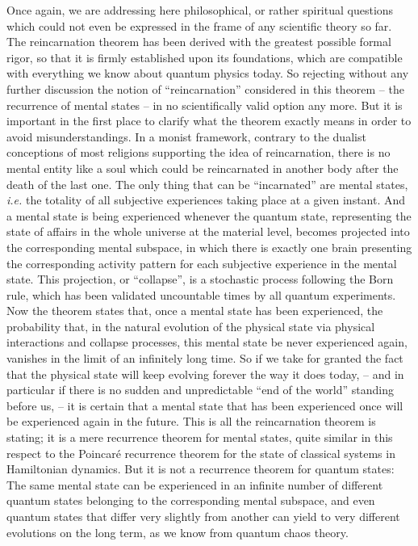  Once again, we are addressing here philosophical, or rather spiritual questions which could not even be expressed in the frame of any scientific theory so far. The reincarnation theorem has been derived with the greatest possible formal rigor, so that it is firmly established upon its foundations, which are compatible with everything we know about quantum physics today. So rejecting without any further discussion the notion of ``reincarnation'' considered in this theorem -- the recurrence of mental states -- in no scientifically valid option any more. But it is important in the first place to clarify what the theorem exactly means in order to avoid misunderstandings. In a monist framework, contrary to the dualist conceptions of most religions supporting the idea of reincarnation, there is no mental entity like a soul which could be reincarnated in another body after the death of the last one. The only thing that can be ``incarnated'' are mental states, \textit{i.e.} the totality of all subjective experiences taking place at a given instant. And a mental state is being experienced whenever the quantum state, representing the state of affairs in the whole universe at the material level, becomes projected into the corresponding mental subspace, in which there is exactly one brain presenting the corresponding activity pattern for each subjective experience in the mental state. This projection, or ``collapse'', is a stochastic process following the Born rule, which has been validated uncountable times by all quantum experiments. Now the theorem states that, once a mental state has been experienced, the probability that, in the natural evolution of the physical state via physical interactions and collapse processes, this mental state be never experienced again, vanishes in the limit of an infinitely long time. So if we take for granted the fact that the physical state will keep evolving forever the way it does today, -- and in particular if there is no sudden and unpredictable ``end of the world'' standing before us, -- it is certain that a mental state that has been experienced once will be experienced again in the future. This is all the reincarnation theorem is stating; it is a mere recurrence theorem for mental states, quite similar in this respect to the Poincaré recurrence theorem for the state of classical systems in Hamiltonian dynamics. But it is not a recurrence theorem for quantum states: The same mental state can be experienced in an infinite number of different quantum states belonging to the corresponding mental subspace, and even quantum states that differ very slightly from another can yield to very different evolutions on the long term, as we know from quantum chaos theory.

